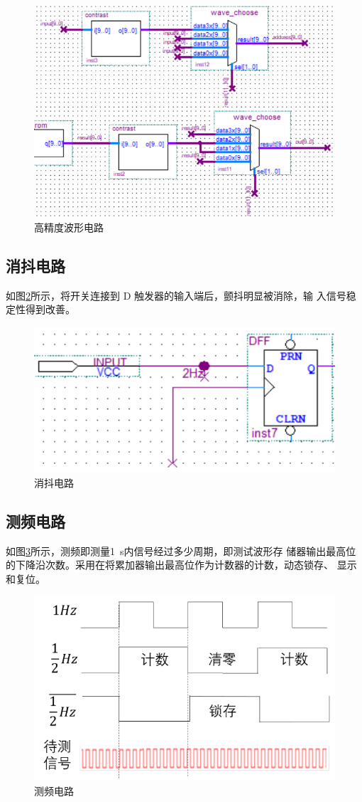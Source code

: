 \documentclass[twoside, openright]{article}
\begin{document}
\begin{figure}[htbp]
	\centering
	\includegraphics[width = 0.7\linewidth]{precision.png}
	\caption{高精度波形电路}
	\label{fig:高精度波形电路}
\end{figure}

\subsection{消抖电路}%
\label{sub:消抖电路}

如图\ref{fig:消抖电路}所示，将开关连接到 D 触发器的输入端后，颤抖明显被消除，输
入信号稳定性得到改善。

\begin{figure}[htbp]
	\centering
	\includegraphics[width = 0.6\linewidth]{tremble.png}
	\caption{消抖电路}
	\label{fig:消抖电路}
\end{figure}

\subsection{测频电路}%
\label{sub:测频电路}

如图\ref{fig:测频电路}所示，测频即测量\SI{1}{\s}内信号经过多少周期，即测试波形存
储器输出最高位的下降沿次数。采用在将累加器输出最高位作为计数器的计数，动态锁存、
显示和复位。

\begin{figure}[htbp]
	\centering
	\includegraphics[width = 0.8\linewidth]{measure.png}
	\caption{测频电路}
	\label{fig:测频电路}
\end{figure}
\end{document}
